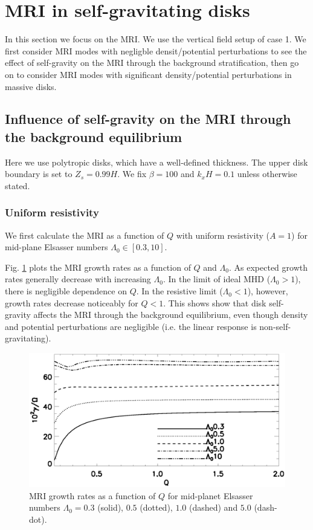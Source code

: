 \section{MRI in self-gravitating disks}
In this section we focus on the MRI. We use the vertical field setup
of case 1. We first consider MRI modes with negligble densit/potential
perturbations to see the effect of self-gravity on the MRI through the
background stratification, then go on to consider MRI modes with
significant density/potential perturbations in massive disks. 

\subsection{Influence of self-gravity on the MRI through the
  background equilibrium}

Here we use polytropic disks, which have a well-defined
thickness. The upper disk boundary is set to 
$Z_s=0.99H$. We fix $\beta=100$ and $k_xH=0.1$ unless otherwise
stated. 


\subsubsection{Uniform
  resistivity}  
We first calculate the MRI as a function of $Q$ with uniform
resistivity ($A=1$) for mid-plane Elsasser numbers $\Lambda_0\in[0.3,10]$.    

Fig. \ref{compare_growth_poly_uniresis} plots the MRI growth rates as
a function of $Q$ and $\Lambda_0$. As expected growth rates generally
decrease with increasing $\Lambda_0$. In the limit of ideal MHD ($\Lambda_0>1$), 
there is negligible dependence on $Q$. In the resistive limit
($\Lambda_0<1$), however, growth rates decrease noticeably for $Q<1$. This shows
show that disk self-gravity affects the MRI through the background
equilibrium, even though density and potential perturbations are  
negligible (i.e. the linear response is
non-self-gravitating).    
 
\begin{figure}
  \includegraphics[width=\linewidth]{figures/compare_growth_poly_uniresis2}
  \caption{MRI growth rates as a function of $Q$ for mid-planet
    Elsasser numbers $\Lambda_0=0.3$ (solid), $0.5$ (dotted), $1.0$
    (dashed) and $5.0$ (dash-dot).  
    \label{compare_growth_poly_uniresis}}
\end{figure}

